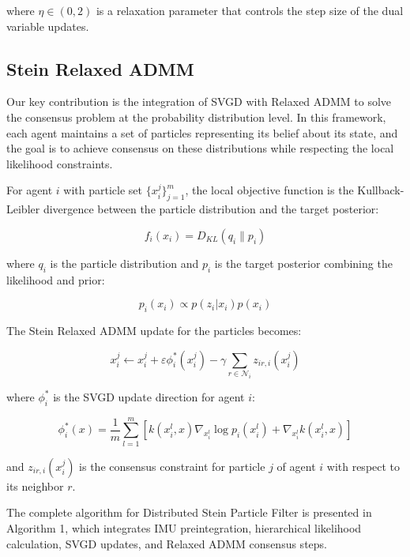 \documentclass[a4paper,fleqn,10pt,twocolumn]{SICE_ISCS}
\begin{document}
where $\eta \in (0, 2)$ is a relaxation parameter that controls the step size of the dual variable updates.

\subsection{Stein Relaxed ADMM}

Our key contribution is the integration of SVGD with Relaxed ADMM to solve the consensus problem at the probability distribution level. In this framework, each agent maintains a set of particles representing its belief about its state, and the goal is to achieve consensus on these distributions while respecting the local likelihood constraints.

For agent $i$ with particle set $\{x_i^j\}_{j=1}^m$, the local objective function is the Kullback-Leibler divergence between the particle distribution and the target posterior:

\begin{equation}
f_i(x_i) = D_{KL}(q_i \| p_i)
\end{equation}

where $q_i$ is the particle distribution and $p_i$ is the target posterior combining the likelihood and prior:

\begin{equation}
p_i(x_i) \propto p(z_i | x_i) p(x_i)
\end{equation}

The Stein Relaxed ADMM update for the particles becomes:

\begin{equation}
x_i^j \leftarrow x_i^j + \varepsilon \phi_i^*(x_i^j) - \gamma \sum_{r \in \mathcal{N}_i} z_{ir,i}(x_i^j)
\end{equation}

where $\phi_i^*$ is the SVGD update direction for agent $i$:

\begin{equation}
\phi_i^*(x) = \frac{1}{m} \sum_{l=1}^m [k(x_i^l, x) \nabla_{x_i^l} \log p_i(x_i^l) + \nabla_{x_i^l} k(x_i^l, x)]
\end{equation}

and $z_{ir,i}(x_i^j)$ is the consensus constraint for particle $j$ of agent $i$ with respect to its neighbor $r$.

The complete algorithm for Distributed Stein Particle Filter is presented in Algorithm 1, which integrates IMU preintegration, hierarchical likelihood calculation, SVGD updates, and Relaxed ADMM consensus steps.
\end{document}
